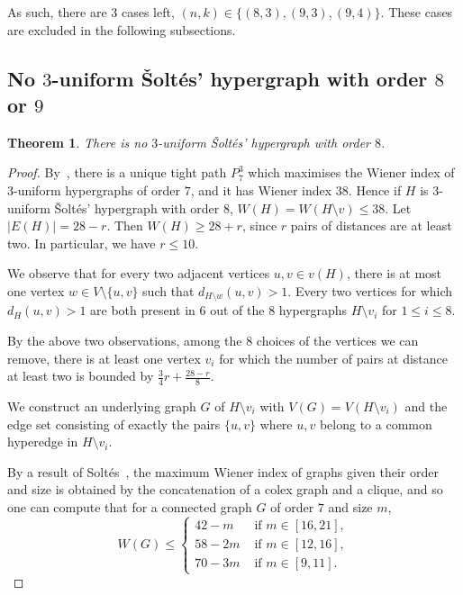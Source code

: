 \documentclass[a4paper,11pt]{article}
\newcommand*{\abs}[1]{\lvert #1\rvert}
\newtheorem{thm}[defi]{Theorem}
\begin{document}
As such, there are $3$ cases left, $(n,k) \in \{(8,3),(9,3),(9,4)\}.$ These cases are excluded in the following subsections.


\subsection{No $3$-uniform \v Solt\'es' hypergraph with order $8$ or $9$}

\begin{thm}\label{thm:no3unif_n8}
     There is no $3$-uniform \v Solt\'es' hypergraph with order $8$.
\end{thm}

\begin{proof}
    By~\cite[Thm.~1]{CGSTT23+}, there is a unique tight path $P_{7}^3$ which maximises the Wiener index of $3$-uniform hypergraphs of order $7$, and it has Wiener index $38$.
    Hence if $H$ is $3$-uniform \v Solt\'es' hypergraph with order $8$, $W(H)=W(H \setminus v) \le 38.$
    Let $\abs{E(H)}=28-r.$
    Then $W(H) \ge 28+r$, since $r$ pairs of distances are at least two.
    In particular, we have $r \le 10.$
    
    We observe that for every two adjacent vertices $u,v \in v(H)$, there is at most one vertex $w \in V \setminus\{u,v\}$ such that $d_{H \setminus w}(u,v)>1.$
    Every two vertices for which $d_H(u,v)>1$ are both present in $6$ out of the $8$ hypergraphs $H\setminus v_i$ for $1 \le i \le 8.$
    
    By the above two observations, among the $8$ choices of the vertices we can remove, there is at least one vertex $v_i$ for which the number of pairs at distance at least two is bounded by $\frac 34 r + \frac{28-r}{8}.$

    We construct an underlying graph $G$ of $H \setminus v_i$ with $V(G)=V(H \setminus v_i)$ and the edge set consisting of exactly the pairs $\{u,v\}$ where $u,v$ belong to a common hyperedge in $H \setminus v_i.$
    
    
    
    By a result of Solt\'es~\cite[Thm.~1]{Soltes91}, the maximum Wiener index of graphs given their order and size is obtained by the concatenation of a colex graph and a clique, and so one can compute that for a connected graph $G$ of order $7$ and size $m$,
    $$W(G) \le
    \begin{cases}
        42-m& \mbox{ if } m \in [16,21],\\
        58-2m& \mbox{ if } m \in [12,16],\\
        70-3m& \mbox{ if } m \in [9,11].
    \end{cases}$$


\end{proof}
\end{document}
